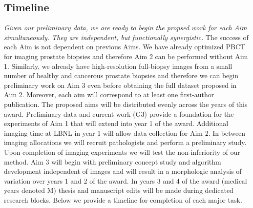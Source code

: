 \documentclass{NIHGrant}
\theoremstyle{theorem}
\begin{document}
\subsection*{Timeline}
%
\emph{Given our preliminary data, we are ready to begin the propsed work for each Aim simultaneously. They are independent, but functionally synergistic.} The success of each Aim is not dependent on previous Aims. We have already optimized PBCT for imaging prostate biopsies and therefore Aim 2 can be performed without Aim 1. Similarly, we already have high-resolution full-biopsy images from a small number of healthy and cancerous prostate biopsies and therefore we can begin preliminary work on Aim 3 even before obtaining the full dataset proposed in Aim 2. Moreover, each aim will correspond to at least one first-author publication. The proposed aims will be distributed evenly across the years of this award. Preliminary data and current work (G3) provide a foundation for the experiments of Aim 1 that will extend into year 1 of the award. Additional imaging time at LBNL in year 1 will allow data collection for Aim 2. In between imaging allocations we will recruit pathologists and perform a preliminary study. Upon completion of imaging experiments we will test the non-inferiority of our method. Aim 3 will begin with preliminary concept study and algorithm development independent of images and will result in a morphologic analysis of variation over years 1 and 2 of the award. In years 3 and 4 of the award (medical years denoted M) thesis and manuscript edits will be made during dedicated research blocks. Below we provide a timeline for completion of each major task.
\end{document}
